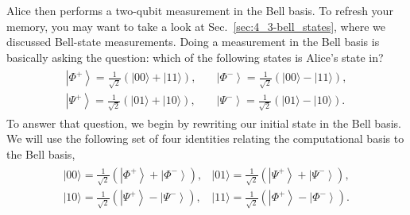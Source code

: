 Alice then performs a two-qubit measurement in the Bell basis.
To refresh your memory, you may want to take a look at Sec.~\ref{sec:4_3-bell_states}, where we discussed Bell-state measurements.
Doing a measurement in the Bell basis is basically asking the question: which of the following states is Alice's state in? 
\begin{align}
\begin{array}{ll}
    \left|\Phi^{+}\right\rangle=\frac{1}{\sqrt{2}}(|00\rangle+|11\rangle), \quad & \left|\Phi^{-}\right\rangle=\frac{1}{\sqrt{2}}(|00\rangle-|11\rangle), \\
    \left|\Psi^{+}\right\rangle=\frac{1}{\sqrt{2}}(|01\rangle+|10\rangle), \quad & \left|\Psi^{-}\right\rangle=\frac{1}{\sqrt{2}}(|01\rangle-|10\rangle).
\end{array}
\end{align}
To answer that question, we begin by rewriting our initial state in the Bell basis.
We will use the following set of four identities relating the computational basis to the Bell basis,
\begin{align}
\begin{array}{ll}
    |00\rangle=\frac{1}{\sqrt{2}}\left(\left|\Phi^{+}\right\rangle+\left|\Phi^{-}\right\rangle\right), & |01\rangle=\frac{1}{\sqrt{2}}\left(\left|\Psi^{+}\right\rangle+\left|\Psi^{-}\right\rangle\right), \\
    |10\rangle=\frac{1}{\sqrt{2}}\left(\left|\Psi^{+}\right\rangle-\left|\Psi^{-}\right\rangle\right), & |11\rangle=\frac{1}{\sqrt{2}}\left(\left|\Phi^{+}\right\rangle-\left|\Phi^{-}\right\rangle\right).
\end{array}
\end{align}

